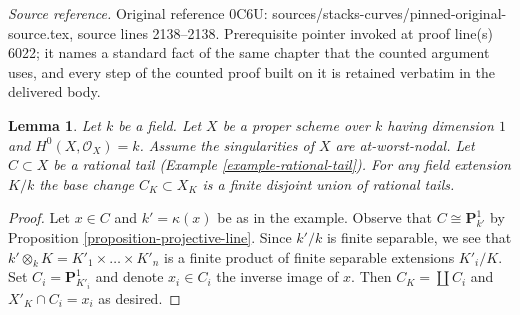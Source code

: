 \documentclass[10pt,a4paper]{amsart}
\theoremstyle{plain}
\newtheorem{lemma}[subsection]{Lemma}
\theoremstyle{definition}
\theoremstyle{remark}
\numberwithin{equation}{subsection}
\begin{document}
\noindent\textit{Source reference.} Original reference 0C6U: sources/stacks-curves/pinned-original-source.tex, source lines 2138--2138. Prerequisite pointer invoked at proof line(s) 6022; it names a standard fact of the same chapter that the counted argument uses, and every step of the counted proof built on it is retained verbatim in the delivered body.\par\medskip
\begin{lemma}
\label{lemma-rational-tail-field-extension}
Let $k$ be a field. Let $X$ be a proper scheme over $k$ having dimension $1$
and $H^0(X, \mathcal{O}_X) = k$. Assume the singularities of $X$ are
at-worst-nodal. Let $C \subset X$ be a rational tail
(Example \ref{example-rational-tail}).
For any field extension $K/k$ the base change $C_K \subset X_K$
is a finite disjoint union of rational tails.
\end{lemma}

\begin{proof}
Let $x \in C$ and $k' = \kappa(x)$ be as in the example.
Observe that $C \cong \mathbf{P}^1_{k'}$ by
Proposition \ref{proposition-projective-line}.
Since $k'/k$ is finite separable, we see that
$k' \otimes_k K = K'_1 \times \ldots \times K'_n$
is a finite product of finite separable extensions $K'_i/K$.
Set $C_i = \mathbf{P}^1_{K'_i}$ and denote $x_i \in C_i$
the inverse image of $x$. Then $C_K = \coprod C_i$ and
$X'_K \cap C_i = x_i$ as desired.
\end{proof}
\end{document}
